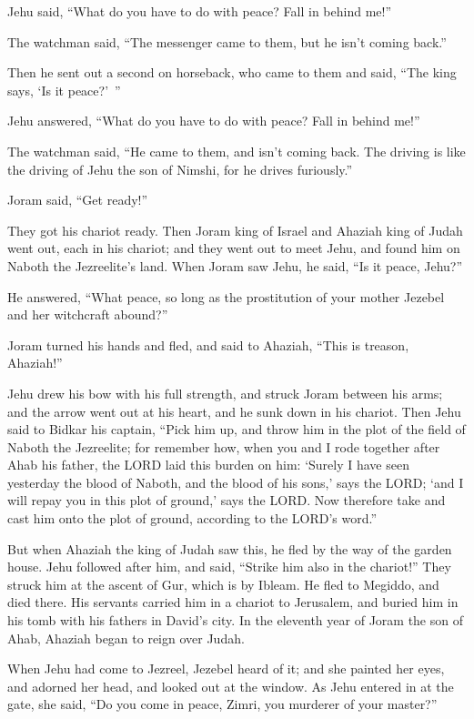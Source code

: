 Jehu said, “What do you have to do with peace? Fall in behind me!”

The watchman said, “The messenger came to them, but he isn’t coming back.”

\myverse{}Then he sent out a second on horseback, who came to them and
said, “The king says, ‘Is it peace?’ ”

Jehu answered, “What do you have to do with peace? Fall in behind me!”

\myverse{}The watchman said, “He came to them, and isn’t coming back. The
driving is like the driving of Jehu the son of Nimshi, for he drives furiously.”

\myverse{}Joram said, “Get ready!”

They got his chariot ready. Then Joram king of Israel and Ahaziah king of Judah went out,
each in his chariot; and they went out to meet Jehu, and found him on Naboth the Jezreelite’s land.
\myverse{}When Joram saw Jehu, he said, “Is it peace, Jehu?”

He answered, “What peace, so long as the prostitution of your mother Jezebel and her witchcraft
abound?”

\myverse{}Joram turned his hands and fled, and said to Ahaziah, “This is
treason, Ahaziah!”

\myverse{}Jehu drew his bow with his full strength, and struck Joram between
his arms; and the arrow went out at his heart, and he sunk down in his chariot.
\myverse{}Then Jehu said to Bidkar his captain, “Pick him up, and throw him in the plot
of the field of Naboth the Jezreelite; for remember how, when you and I rode together after Ahab his father,
the LORD laid this burden on him:
\myverse{}‘Surely I have seen yesterday the blood of Naboth, and the blood of his sons,’
says the LORD; ‘and I will repay you in this plot of ground,’ says the LORD. Now therefore take and cast
him onto the plot of ground, according to the LORD’s word.”

\myverse{}But when Ahaziah the king of Judah saw this, he fled by the way
of the garden house. Jehu followed after him, and said, “Strike him also in the chariot!” They struck
him at the ascent of Gur, which is by Ibleam. He fled to Megiddo, and died there.
\myverse{}His servants carried him in a chariot to Jerusalem, and buried him in his
tomb with his fathers in David’s city.
\myverse{}In the eleventh year of Joram the son of Ahab, Ahaziah began to reign over
Judah.

\myverse{}When Jehu had come to Jezreel, Jezebel heard of it; and she painted
her eyes, and adorned her head, and looked out at the window.
\myverse{}As Jehu entered in at the gate, she said, “Do you come in peace, Zimri, you
murderer of your master?”

